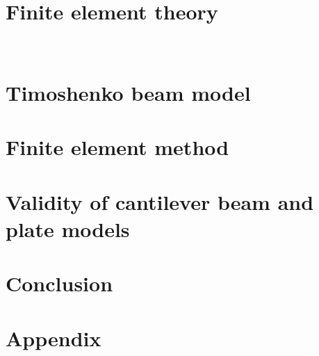 \documentclass[12pt]{report}
\begin{document}
\chapter{Finite element theory}


\

\chapter{Timoshenko beam model}
 






\chapter{Finite element method}




\chapter{Validity of cantilever beam and plate models}




\chapter{Conclusion}


% 

\printbibliography


\chapter*{Appendix}



% 
% 
% 
% 
\end{document}
